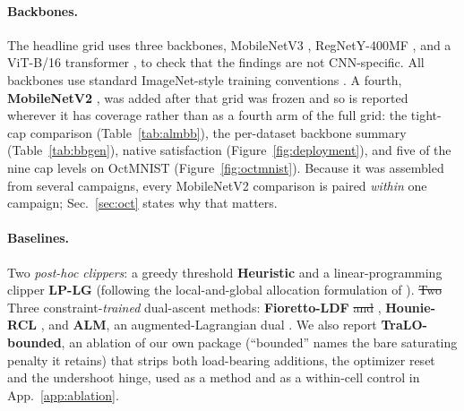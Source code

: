 \documentclass[10pt]{article}
\newcommand{\del}[1]{{\color{red}\sout{#1}}}
\begin{document}
\paragraph{Backbones.}
The headline grid uses three backbones, MobileNetV3
\citep{howard2019searching}, RegNetY-400MF \citep{radosavovic2020designing},
and a ViT-B/16 transformer \citep{dosovitskiy2020image}, to check that the
findings are not CNN-specific. All backbones use standard ImageNet-style
training conventions \citep{he2016deep}.
{\color{blue}A fourth, \textbf{MobileNetV2} \citep{sandler2018mobilenetv2}, was
added after that grid was frozen and so is reported wherever it has coverage
rather than as a fourth arm of the full grid: the tight-cap comparison
(Table~\ref{tab:almbb}), the per-dataset backbone summary
(Table~\ref{tab:bbgen}), native satisfaction (Figure~\ref{fig:deployment}), and
five of the nine cap levels on OctMNIST (Figure~\ref{fig:octmnist}). Because it
was assembled from several campaigns, every MobileNetV2 comparison is paired
\emph{within} one campaign; Sec.~\ref{sec:oct} states why that matters.}

\paragraph{Baselines.}
Two \emph{post-hoc clippers}: a greedy threshold \textbf{Heuristic} and a
linear-programming clipper \textbf{LP-LG} (following the local-and-global
allocation formulation of \citealt{shifman2025classification}). \del{Two}%
{\color{blue}Three}
constraint-\emph{trained} dual-ascent
methods: \textbf{Fioretto-LDF} \citep{fioretto2020lagrangian}\del{ and}%
{\color{blue},}
\textbf{Hounie-RCL} \citep{hounie2023resilient}{\color{blue}, and \textbf{ALM},
an augmented-Lagrangian dual \citep{bertsekas1982constrained}}. We also report
\textbf{TraLO-bounded}, an ablation of our own package (``bounded'' names
the bare saturating penalty it retains) that strips both load-bearing
additions, the optimizer reset and the undershoot hinge, used as a method
and as a within-cell control in App.~\ref{app:ablation}.
\end{document}
